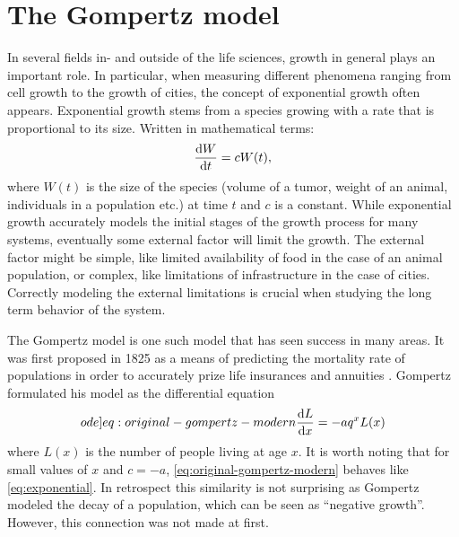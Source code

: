 \section{The Gompertz model}

In several fields in- and outside of the life sciences, growth in general plays an important role.
In particular, when measuring different phenomena ranging from cell growth to the growth of cities, the concept of exponential growth often appears.
Exponential growth stems from a species growing with a rate that is proportional to its size.
Written in mathematical terms:
\begin{equation} \label{eq:exponential}
  \diff{W}{t} = c W(t),
\end{equation}
where \(W(t)\) is the size of the species (volume of a tumor, weight of an animal, individuals in a population etc.) at time \(t\) and \(c\) is a constant.
While exponential growth accurately models the initial stages of the growth process for many systems, eventually some external factor will limit the growth.
The external factor might be simple, like limited availability of food in the case of an animal population, or complex, like limitations of infrastructure in the case of cities. %
Correctly modeling the external limitations is crucial when studying the long term behavior of the system.

The Gompertz model is one such model that has seen success in many areas.
It was first proposed in 1825 as a means of predicting the mortality rate of populations in order to accurately prize life insurances and annuities \cite{gompertz1825nature}.
Gompertz formulated his model as the differential equation
\begin{equation} \label[ode]{eq:original-gompertz-modern}
  \diff{L}{x} = -a q^x L(x)
\end{equation}
where \(L(x)\) is the number of people living at age \(x\). %
It is worth noting that for small values of \(x\) and \(c = -a\), \cref{eq:original-gompertz-modern} behaves like \cref{eq:exponential}.
In retrospect this similarity is not surprising as Gompertz modeled the decay of a population, which can be seen as \enquote{negative growth}.
However, this connection was not made at first.

